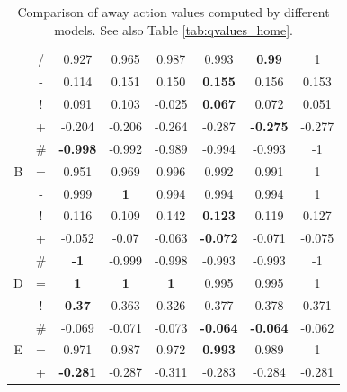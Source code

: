 \documentclass{sfuthesis}
\begin{document}
\begin{table}
\begin{tabular}{cc|ccccc|c}
			& /      & 0.927              & 0.965               & 0.987             & 0.993          & \textbf{0.99}               & 1             \\
			& -      & 0.114              & 0.151               & 0.150             & \textbf{0.155}          & 0.156              & 0.153         \\
			& !      & 0.091              & 0.103               & -0.025            & \textbf{0.067}          & 0.072              & 0.051         \\
			& +      & -0.204             & -0.206              & -0.264            & -0.287         & \textbf{-0.275}             & -0.277        \\
			& \#     & \textbf{-0.998}             & -0.992              & -0.989            & -0.994         & -0.993             & -1            \\ \hline
			B      & =      & 0.951              & 0.969               & 0.996             & 0.992          & 0.991              & 1             \\
			& -      & 0.999              & \textbf{1}                   & 0.994             & 0.994          & 0.994              & 1             \\
			& !      & 0.116              & 0.109               & 0.142             & \textbf{0.123}          & 0.119              & 0.127         \\
			& +      & -0.052             & -0.07               & -0.063            & \textbf{-0.072}         & -0.071             &  -0.075        \\
			& \#     & \textbf{-1}                 & -0.999              & -0.998            & -0.993         & -0.993             & -1            \\ \hline
			D      & =      & \textbf{1}                  & \textbf{1}                   & \textbf{1}                 & 0.995          & 0.995              & 1             \\
			& !      & \textbf{0.37}               & 0.363               & 0.326             & 0.377          & 0.378              & 0.371         \\
			& \#     & -0.069             & -0.071              & -0.073            & \textbf{-0.064}         & \textbf{-0.064}             & -0.062        \\ \hline
			E      & =      & 0.971              & 0.987               & 0.972             & \textbf{0.993}          & 0.989              & 1             \\
			& +      & \textbf{-0.281}             & -0.287              & -0.311            & -0.283         & -0.284             & -0.281       
		\end{tabular}
		\caption{Comparison of away action values computed by different models. See also Table \ref{tab:qvalues_home}.}
		\label{tab:qvalues_away}
	\end{table}
	
\end{document}
